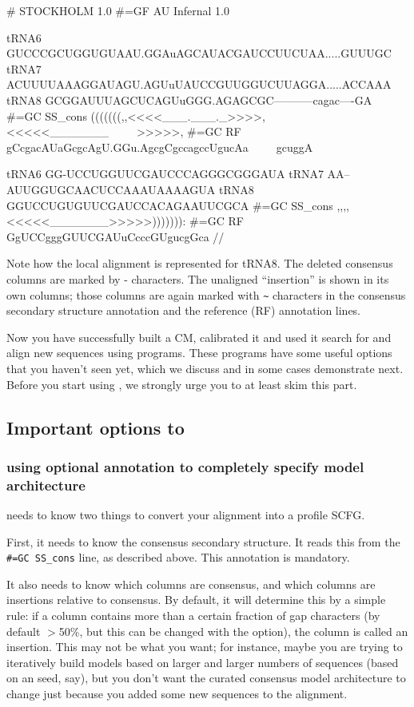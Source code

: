 {\samepage
\begin{sreoutput}
# STOCKHOLM 1.0
#=GF AU Infernal 1.0

tRNA6        GUCCCGCUGGUGUAAU.GGAuAGCAUACGAUCCUUCUAA.....GUUUGC
tRNA7        ACUUUUAAAGGAUAGU.AGUuUAUCCGUUGGUCUUAGGA.....ACCAAA
tRNA8        GCGGAUUUAGCUCAGUuGGG.AGAGCGC-----------cagac----GA
#=GC SS_cons (((((((,,<<<<___.___._>>>>,<<<<<_______~~~~~>>>>>,
#=GC RF      gCcgacAUaGcgcAgU.GGu.AgcgCgccagccUgucAa~~~~~gcuggA

tRNA6        GG-UCCUGGUUCGAUCCCAGGGCGGGAUA
tRNA7        AA--AUUGGUGCAACUCCAAAUAAAAGUA
tRNA8        GGUCCUGUGUUCGAUCCACAGAAUUCGCA
#=GC SS_cons ,,,,<<<<<_______>>>>>))))))):
#=GC RF      GgUCCgggGUUCGAUuCcccGUgucgGca
//
\end{sreoutput}
}

Note how the local alignment is represented for tRNA8. The deleted
consensus columns are marked by - characters. The unaligned
``insertion'' is shown in its own columns; those columns are again
marked with \verb+~+ characters in the consensus secondary structure
annotation and the reference (RF) annotation lines.

Now you have successfully built a CM, calibrated it and used it search
for and align new sequences using  programs.
These programs have some useful options that you haven't seen
yet, which we discuss and in some cases demonstrate next. Before you
start using , we strongly urge you to at
least skim this part. 

\subsection{Important options to }

\subsubsection{using optional annotation to completely specify model architecture}

 needs to know two things to convert your alignment into
a profile SCFG.

First, it needs to know the consensus secondary structure. It reads
this from the {\small\verb+#=GC SS_cons+} line, as described
above. This annotation is mandatory.

It also needs to know which columns are consensus, and which columns
are insertions relative to consensus. By default, it will determine
this by a simple rule: if a column contains more than a certain
fraction of gap characters (by default $>$50\%, but this can be changed
with the  option), the column is called an
insertion. This may not be what you want; for instance, maybe you are
trying to iteratively build models based on larger and larger numbers
of sequences (based on an  seed, say), but you don't
want the curated consensus model architecture to change just because
you added some new sequences to the alignment.

